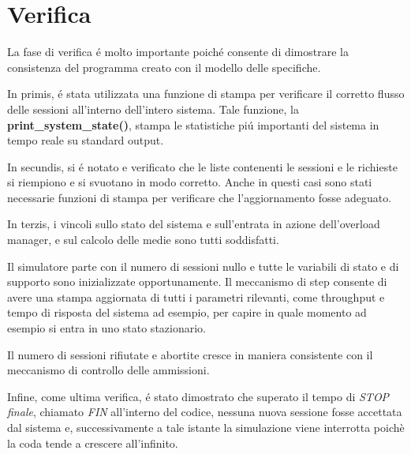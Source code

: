  
\chapter{Verifica}

La fase di verifica \'e molto importante poich\'e consente di dimostrare la consistenza del programma creato con il modello delle specifiche.

\vspace{0.3cm}In primis, \'e stata utilizzata una funzione di stampa per verificare il corretto flusso delle sessioni all'interno dell'intero sistema. Tale funzione, la \textbf{print\_system\_state()}, stampa le statistiche pi\'u importanti del sistema in tempo reale su standard output.

\vspace{0.3cm}In secundis, si \'e notato e verificato che le liste contenenti le sessioni e le richieste si riempiono e si svuotano in modo corretto. Anche in questi casi sono stati necessarie funzioni di stampa per verificare che l'aggiornamento fosse adeguato.

\vspace{0.3cm}In terzis, i vincoli sullo stato del sistema e sull'entrata in azione dell'overload manager, e sul calcolo delle medie sono tutti soddisfatti.

\vspace{0.3cm}Il simulatore parte con il numero di sessioni nullo e tutte le variabili di stato e di supporto sono inizializzate opportunamente. Il meccanismo di step consente di avere una stampa aggiornata di tutti i parametri rilevanti, come throughput e tempo di risposta del sistema ad esempio, per capire in quale momento ad esempio si entra in uno stato stazionario.

\vspace{0.3cm}Il numero di sessioni rifiutate e abortite cresce in maniera consistente con il meccanismo di controllo delle ammissioni.

\vspace{0.3cm}Infine, come ultima verifica, \'e stato dimostrato che superato il tempo di \textit{STOP finale}, chiamato \textit{FIN} all'interno del codice, nessuna nuova sessione fosse accettata dal sistema e, successivamente a tale istante la simulazione viene interrotta poichè la coda tende a crescere all'infinito.